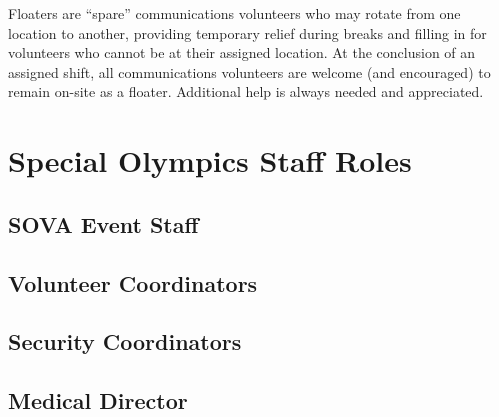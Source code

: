 \documentclass[pdflatex,letterpaper,twoside,12pt]{book}
\begin{document}
Floaters are ``spare'' communications volunteers who may rotate from one location to another, providing temporary relief during breaks and filling in for volunteers who cannot be at their assigned location.  At the conclusion of an assigned shift, all communications volunteers are welcome (and encouraged) to remain on-site as a floater.  Additional help is always needed and appreciated.


\chapter{Special Olympics Staff Roles}

\section{SOVA Event Staff}


\section{Volunteer Coordinators}


\section{Security Coordinators}


\section{Medical Director}
\end{document}
